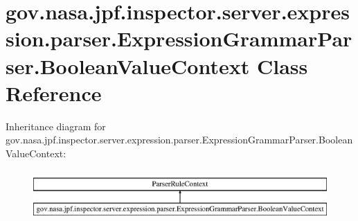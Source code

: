 \hypertarget{classgov_1_1nasa_1_1jpf_1_1inspector_1_1server_1_1expression_1_1parser_1_1_expression_grammar_parser_1_1_boolean_value_context}{}\section{gov.\+nasa.\+jpf.\+inspector.\+server.\+expression.\+parser.\+Expression\+Grammar\+Parser.\+Boolean\+Value\+Context Class Reference}
\label{classgov_1_1nasa_1_1jpf_1_1inspector_1_1server_1_1expression_1_1parser_1_1_expression_grammar_parser_1_1_boolean_value_context}
Inheritance diagram for gov.\+nasa.\+jpf.\+inspector.\+server.\+expression.\+parser.\+Expression\+Grammar\+Parser.\+Boolean\+Value\+Context\+:\begin{figure}[H]
\begin{center}
\leavevmode
\includegraphics[height=1.954625cm]{classgov_1_1nasa_1_1jpf_1_1inspector_1_1server_1_1expression_1_1parser_1_1_expression_grammar_parser_1_1_boolean_value_context}
\end{center}
\end{figure}
